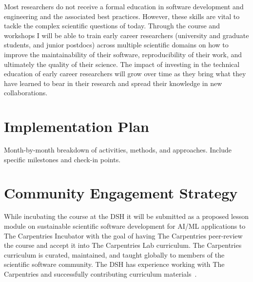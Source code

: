 \documentclass[letterpaper, 11pt]{article}
\begin{document}
Most researchers do not receive a formal education in software development and engineering and the associated best practices.
However, these skills are vital to tackle the complex scientific questions of today.
Through the course and workshops I will be able to train early career researchers (university and graduate students, and junior postdocs) across multiple scientific domains on how to improve the maintainability of their software, reproducibility of their work, and ultimately the quality of their science.
The impact of investing in the technical education of early career researchers will grow over time as they bring what they have learned to bear in their research and spread their knowledge in new collaborations.

\section{Implementation Plan}

Month-by-month breakdown of activities, methods, and approaches.
Include specific milestones and check-in points.

\section{Community Engagement Strategy}


While incubating the course at the DSH it will be submitted as a proposed lesson module on sustainable scientific software development for AI/ML applications to The Carpentries Incubator with the goal of having The Carpentries peer-review the course and accept it into The Carpentries Lab curriculum.
The Carpentries curriculum is curated, maintained, and taught globally to members of the scientific software community.
The DSH has experience working with The Carpentries and successfully contributing curriculum materials~\cite{backhaus_2024_14360351}.
\end{document}
